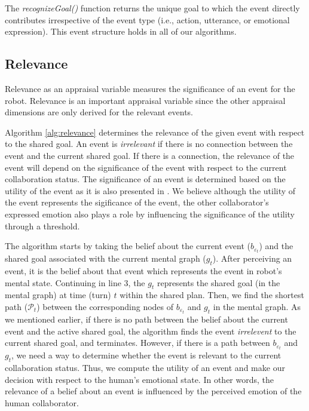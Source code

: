 \documentclass[letterpaper]{article}
\begin{document}
The \textit{recognizeGoal()} function returns the unique goal to which the event
directly contributes irrespective of the event type (i.e., action, utterance, or
emotional expression). This event structure holds in all of our algorithms.

\subsection{Relevance}

Relevance as an appraisal variable measures the significance of an event for the
robot. Relevance is an important appraisal variable since the other appraisal
dimensions are only derived for the relevant events.

Algorithm \ref{alg:relevance} determines the relevance of the given event with
respect to the shared goal. An event is \textit{irrelevant} if there is no
connection between the event and the current shared goal. If there is a
connection, the relevance of the event will depend on the significance of the
event with respect to the current collaboration status. The significance of an
event is determined based on the utility of the event as it is also presented in
\cite{gratch:domain-independent,marsella:ema-process-model}. We believe although
the utility of the event represents the sigificance of the event, the other
collaborator's expressed emotion also plays a role by influencing the
significance of the utility through a threshold. 

The algorithm starts by taking the belief about the current event
($\mathit{b}_{\varepsilon_t}$) and the shared goal associated with the current
mental graph ($g_{t}$). After perceiving an event, it is the belief about that
event which represents the event in robot's mental state. Continuing in line 3,
the $g_{t}$ represents the shared goal (in the mental graph) at time (turn) $t$
within the shared plan. Then, we find the shortest path ($\mathcal{P}_{t}$)
between the corresponding nodes of $\mathit{b}_{\varepsilon_t}$ and $g_{t}$ in
the mental graph. As we mentioned earlier, if there is no path between the
belief about the current event and the active shared goal, the algorithm finds
the event \textit{irrelevent} to the current shared goal, and terminates.
However, if there is a path between $\mathit{b}_{\varepsilon_t}$ and $g_{t}$, we
need a way to determine whether the event is relevant to the current
collaboration status. Thus, we compute the utility of an event and make our
decision with respect to the human's emotional state. In other words, the
relevance of a belief about an event is influenced by the perceived emotion of
the human collaborator. 
\end{document}
